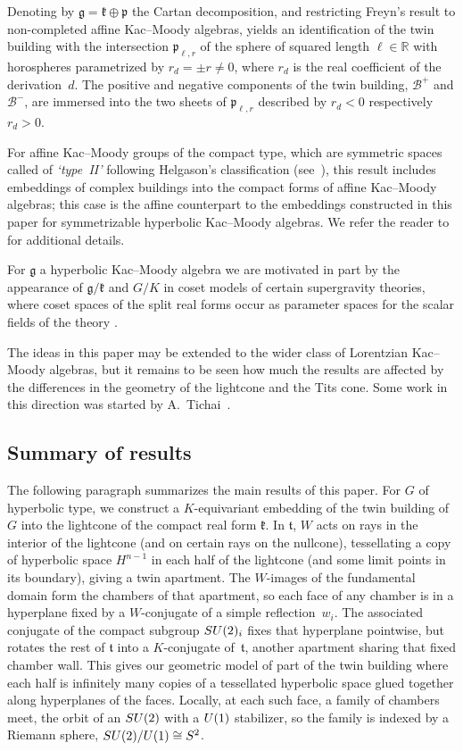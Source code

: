 \documentclass[11pt]{article}
\numberwithin{equation}{section}
\numberwithin{equation}{section}
\def\R{\mathbb{R}}
\def\cB{\mathcal B}
\def\g{\mathfrak{g}}
\def\fg{\mathfrak{g}}
\def\k{\mathfrak{k}}
\def\fk{\mathfrak{k}}
\def\p{\mathfrak{p}}
\def\ft{\mathfrak{t}}
\begin{document}
Denoting by $\g=\k \oplus \p$ the Cartan decomposition, and restricting Freyn's result to non-completed affine Kac--Moody algebras, yields an identification of the twin building with the intersection $\p_{\ell, r}$ of the sphere of squared length $\ell\in \R$ with horospheres parametrized by $r_d=\pm r\not=0$, where $r_d$ is the real coefficient of the derivation~$d$. The positive and negative components of the twin building, $\cB^+$ and $\cB^-$, are immersed into the two sheets of $\p_{\ell, r}$ described by $r_d<0$ respectively~$r_d>0$.

For affine Kac--Moody groups of the compact type, which are symmetric spaces called of \emph{`type~II'} following Helgason's classification (see~\cite{Freyn15, Helgason01}), this result includes embeddings of complex buildings into the compact forms of affine Kac--Moody algebras; this case is the affine counterpart to the embeddings constructed in this paper for symmetrizable hyperbolic Kac--Moody algebras. We refer the reader to~\cite{Freyn09, Freyn10b, Freyn10a, Freyn10d} for additional details.

For $\g$ a hyperbolic Kac--Moody algebra we are motivated in part by the appearance of $\fg/\fk$ and $G/K$ in coset models of certain supergravity theories, where coset spaces of the split real forms occur as parameter spaces for the scalar fields of the theory \cite{DamourHenneauxNicolai02,Julia85, West01}.

The ideas in this paper may be extended to the wider class of Lorentzian Kac--Moody algebras, but it remains to be seen how much the results are affected by the differences in the geometry of the lightcone and the Tits cone. Some work in this direction was started by A.~Tichai~\cite{Tich14}.

\subsection{Summary of results}\label{subsection:Summary of results}

The following paragraph summarizes the main results of this paper.
For $G$ of hyperbolic type, we construct a $K$-equivariant embedding of the twin building of $G$ into the lightcone of the compact
real form $\fk$. In $\ft$, $W$ acts on rays in the interior of the lightcone (and on certain rays on the nullcone), tessellating a copy of
hyperbolic space $H^{n-1}$ in each half of the lightcone (and some limit points in its boundary), giving a twin apartment. The $W$-images of the fundamental domain form the chambers of that apartment, so each face of any chamber is in a hyperplane fixed by a $W$-conjugate of a simple reflection~$w_i$. The associated conjugate of the compact subgroup ${\rm SU}(2)_i$ fixes that hyperplane pointwise, but rotates the rest of $\ft$ into a $K$-conjugate of~$\ft$, another apartment sharing that fixed chamber wall.
This gives our geometric model of part of the twin building where each half is infinitely many copies of a tessellated hyperbolic space glued together along hyperplanes of the faces. Locally, at each such face, a family of chambers meet, the orbit of an ${\rm SU}(2)$ with a ${\rm U}(1)$ stabilizer, so the family is indexed by a Riemann sphere, ${\rm SU}(2)/{\rm U}(1) \cong S^2$.
\end{document}
